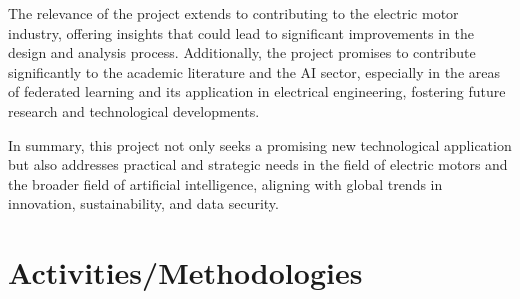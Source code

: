 \documentclass{article}
\begin{document}
The relevance of the project extends to contributing to the electric motor industry, offering insights that could lead to significant improvements in the design and analysis process. Additionally, the project promises to contribute significantly to the academic literature and the AI sector, especially in the areas of federated learning and its application in electrical engineering, fostering future research and technological developments.

In summary, this project not only seeks a promising new technological application but also addresses practical and strategic needs in the field of electric motors and the broader field of artificial intelligence, aligning with global trends in innovation, sustainability, and data security.

\section{Activities/Methodologies}
\end{document}
